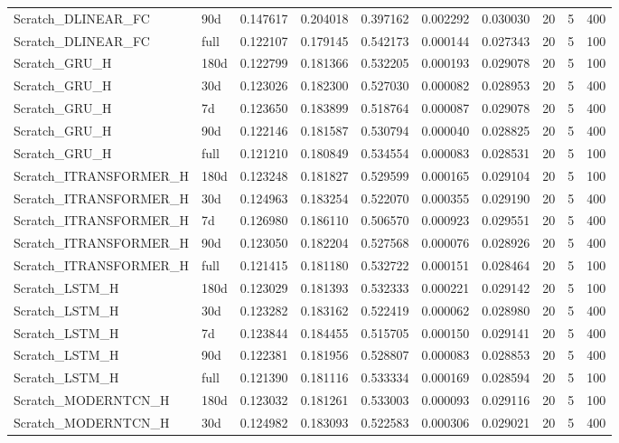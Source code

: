 \begin{tabular}{llrrrrrrrr}
Scratch\_DLINEAR\_FC & 90d & 0.147617 & 0.204018 & 0.397162 & 0.002292 & 0.030030 & 20 & 5 & 400 \\
Scratch\_DLINEAR\_FC & full & 0.122107 & 0.179145 & 0.542173 & 0.000144 & 0.027343 & 20 & 5 & 100 \\
Scratch\_GRU\_H & 180d & 0.122799 & 0.181366 & 0.532205 & 0.000193 & 0.029078 & 20 & 5 & 100 \\
Scratch\_GRU\_H & 30d & 0.123026 & 0.182300 & 0.527030 & 0.000082 & 0.028953 & 20 & 5 & 400 \\
Scratch\_GRU\_H & 7d & 0.123650 & 0.183899 & 0.518764 & 0.000087 & 0.029078 & 20 & 5 & 400 \\
Scratch\_GRU\_H & 90d & 0.122146 & 0.181587 & 0.530794 & 0.000040 & 0.028825 & 20 & 5 & 400 \\
Scratch\_GRU\_H & full & 0.121210 & 0.180849 & 0.534554 & 0.000083 & 0.028531 & 20 & 5 & 100 \\
Scratch\_ITRANSFORMER\_H & 180d & 0.123248 & 0.181827 & 0.529599 & 0.000165 & 0.029104 & 20 & 5 & 100 \\
Scratch\_ITRANSFORMER\_H & 30d & 0.124963 & 0.183254 & 0.522070 & 0.000355 & 0.029190 & 20 & 5 & 400 \\
Scratch\_ITRANSFORMER\_H & 7d & 0.126980 & 0.186110 & 0.506570 & 0.000923 & 0.029551 & 20 & 5 & 400 \\
Scratch\_ITRANSFORMER\_H & 90d & 0.123050 & 0.182204 & 0.527568 & 0.000076 & 0.028926 & 20 & 5 & 400 \\
Scratch\_ITRANSFORMER\_H & full & 0.121415 & 0.181180 & 0.532722 & 0.000151 & 0.028464 & 20 & 5 & 100 \\
Scratch\_LSTM\_H & 180d & 0.123029 & 0.181393 & 0.532333 & 0.000221 & 0.029142 & 20 & 5 & 100 \\
Scratch\_LSTM\_H & 30d & 0.123282 & 0.183162 & 0.522419 & 0.000062 & 0.028980 & 20 & 5 & 400 \\
Scratch\_LSTM\_H & 7d & 0.123844 & 0.184455 & 0.515705 & 0.000150 & 0.029141 & 20 & 5 & 400 \\
Scratch\_LSTM\_H & 90d & 0.122381 & 0.181956 & 0.528807 & 0.000083 & 0.028853 & 20 & 5 & 400 \\
Scratch\_LSTM\_H & full & 0.121390 & 0.181116 & 0.533334 & 0.000169 & 0.028594 & 20 & 5 & 100 \\
Scratch\_MODERNTCN\_H & 180d & 0.123032 & 0.181261 & 0.533003 & 0.000093 & 0.029116 & 20 & 5 & 100 \\
Scratch\_MODERNTCN\_H & 30d & 0.124982 & 0.183093 & 0.522583 & 0.000306 & 0.029021 & 20 & 5 & 400 \\

\end{tabular}
